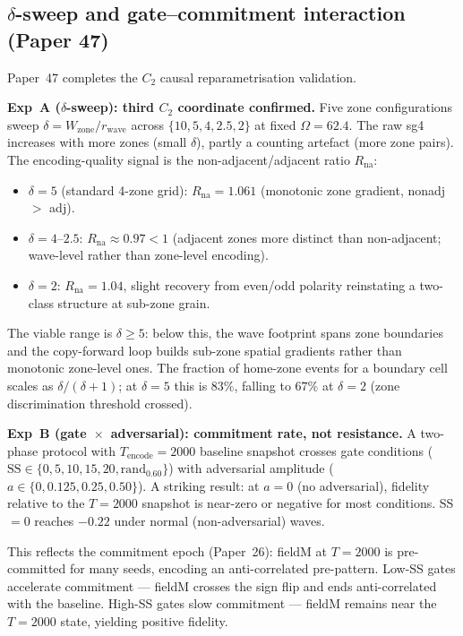 \documentclass[11pt]{article}
\begin{document}
\subsection{$\delta$-sweep and gate--commitment interaction (Paper 47)}

Paper~47 completes the $C_2$ causal reparametrisation validation.

\textbf{Exp~A ($\delta$-sweep): third $C_2$ coordinate confirmed.}
Five zone configurations sweep $\delta = W_\mathrm{zone}/r_\mathrm{wave}$
across $\{10, 5, 4, 2.5, 2\}$ at fixed $\Omega = 62.4$.
The raw sg4 increases with more zones (small $\delta$), partly a counting
artefact (more zone pairs).  The encoding-quality signal is the
non-adjacent/adjacent ratio $R_\mathrm{na}$:
\begin{itemize}
  \item $\delta = 5$ (standard 4-zone grid): $R_\mathrm{na} = 1.061$
        (monotonic zone gradient, nonadj $>$ adj).
  \item $\delta = 4$--$2.5$: $R_\mathrm{na} \approx 0.97 < 1$
        (adjacent zones more distinct than non-adjacent; wave-level
        rather than zone-level encoding).
  \item $\delta = 2$: $R_\mathrm{na} = 1.04$, slight recovery from even/odd
        polarity reinstating a two-class structure at sub-zone grain.
\end{itemize}
The viable range is $\delta \geq 5$: below this, the wave footprint spans
zone boundaries and the copy-forward loop builds sub-zone spatial
gradients rather than monotonic zone-level ones.
The fraction of home-zone events for a boundary cell scales as
$\delta/(\delta+1)$; at $\delta=5$ this is $83\%$, falling to $67\%$ at
$\delta=2$ (zone discrimination threshold crossed).

\textbf{Exp~B (gate~$\times$~adversarial): commitment rate, not resistance.}
A two-phase protocol with $T_\mathrm{encode}=2000$ baseline snapshot
crosses gate conditions ($\mathrm{SS}\in\{0,5,10,15,20,\mathrm{rand}_{0.60}\}$)
with adversarial amplitude ($a\in\{0,0.125,0.25,0.50\}$).
A striking result: at $a=0$ (no adversarial), fidelity relative to the
$T=2000$ snapshot is near-zero or negative for most conditions.
SS$=0$ reaches $-0.22$ under normal (non-adversarial) waves.

This reflects the commitment epoch (Paper~26): fieldM at $T=2000$
is pre-committed for many seeds, encoding an anti-correlated
pre-pattern.  Low-SS gates accelerate commitment --- fieldM crosses the
sign flip and ends anti-correlated with the baseline.
High-SS gates slow commitment --- fieldM remains near the $T=2000$
state, yielding positive fidelity.
\end{document}
